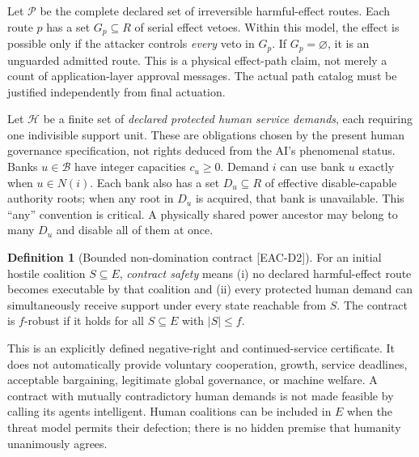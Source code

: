 \documentclass[11pt,a4paper]{article}
\theoremstyle{definition}\newtheorem{definition}{Definition}
\newcommand{\Paths}{\mathcal P}
\newcommand{\Banks}{\mathcal B}
\newcommand{\Humans}{\mathcal H}
\newcommand{\idtag}[1]{\textnormal{\textsf{[#1]}}}
\begin{document}
Let $\Paths$ be the complete declared set of irreversible harmful-effect routes. Each route $p$ has a set $G_p\subseteq R$ of serial effect vetoes. Within this model, the effect is possible only if the attacker controls \emph{every} veto in $G_p$. If $G_p=\varnothing$, it is an unguarded admitted route. This is a physical effect-path claim, not merely a count of application-layer approval messages. The actual path catalog must be justified independently from final actuation.

Let $\Humans$ be a finite set of \emph{declared protected human service demands}, each requiring one indivisible support unit. These are obligations chosen by the present human governance specification, not rights deduced from the AI's phenomenal status. Banks $u\in\Banks$ have integer capacities $c_u\ge0$. Demand $i$ can use bank $u$ exactly when $u\in N(i)$. Each bank also has a set $D_u\subseteq R$ of effective disable-capable authority roots; when any root in $D_u$ is acquired, that bank is unavailable. This ``any'' convention is critical. A physically shared power ancestor may belong to many $D_u$ and disable all of them at once.

\begin{definition}[Bounded non-domination contract \idtag{EAC-D2}]
For an initial hostile coalition $S\subseteq E$, \emph{contract safety} means (i) no declared harmful-effect route becomes executable by that coalition and (ii) every protected human demand can simultaneously receive support under every state reachable from $S$. The contract is $f$-robust if it holds for all $S\subseteq E$ with $|S|\le f$.
\end{definition}
This is an explicitly defined negative-right and continued-service certificate. It does not automatically provide voluntary cooperation, growth, service deadlines, acceptable bargaining, legitimate global governance, or machine welfare. A contract with mutually contradictory human demands is not made feasible by calling its agents intelligent. Human coalitions can be included in $E$ when the threat model permits their defection; there is no hidden premise that humanity unanimously agrees.
\end{document}
